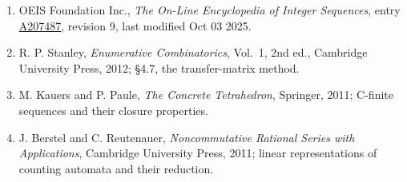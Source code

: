 \documentclass[11pt]{article}
\theoremstyle{definition}
\begin{document}
\begin{enumerate}

\item OEIS Foundation Inc., \emph{The On-Line Encyclopedia of Integer Sequences}, entry \href{https://oeis.org/A207487}{A207487}, revision 9, last modified Oct 03 2025.

\item R. P. Stanley, \emph{Enumerative Combinatorics}, Vol.~1, 2nd ed., Cambridge University Press, 2012; \S4.7, the transfer-matrix method.

\item M. Kauers and P. Paule, \emph{The Concrete Tetrahedron}, Springer, 2011; C-finite sequences and their closure properties.

\item J. Berstel and C. Reutenauer, \emph{Noncommutative Rational Series with Applications}, Cambridge University Press, 2011; linear representations of counting automata and their reduction.

\end{enumerate}
\end{document}
